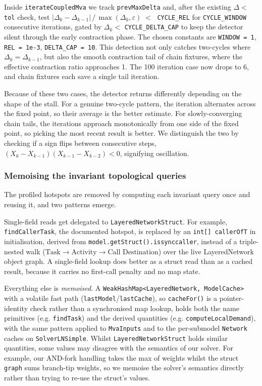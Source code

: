 Inside \texttt{iterateCoupledMva} we track \texttt{prevMaxDelta} and, after the existing \texttt{$\Delta <$ tol} check, test $|\Delta_k - \Delta_{k-1}| \,/\, \max(\Delta_k, \varepsilon) \;<\;$ \texttt{CYCLE\_REL} for \texttt{CYCLE\_WINDOW} consecutive iterations, gated by $\Delta_k <$ \texttt{CYCLE\_DELTA\_CAP} to keep the detector silent through the early contraction phase. The chosen constants are \texttt{WINDOW = 1}, \texttt{REL = 1e-3}, \texttt{DELTA\_CAP = 10}. This detection not only catches two-cycles where $\Delta_k = \Delta_{k-1}$, but also the smooth contraction tail of chain fixtures, where the effective contraction ratio approaches 1. The 100 iteration case now drops to 6, and chain fixtures each save a single tail iteration.

Because of these two cases, the detector returns differently depending on the shape of the stall. For a genuine two-cycle pattern, the iteration alternates across the fixed point, so their average is the better estimate. For slowly-converging chain tails, the iterations approach monotonically from one side of the fixed point, so picking the most recent result is better. We distinguish the two by checking if a sign flips between consecutive steps, $(X_k - X_{k-1})(X_{k-1} - X_{k-2}) < 0$, signifying oscillation.

\subsubsection*{Memoising the invariant topological queries}

The profiled hotspots are removed by computing each invariant query once and reusing it, and two patterns emerge. 

Single-field reads get delegated to \texttt{LayeredNetworkStruct}. For example, \texttt{findCallerTask}, the documented hotspot, is replaced by an \texttt{int[] callerOfT} in initialisation, derived from \texttt{model.getStruct().issynccaller}, instead of a triple-nested walk ($\text{Task} \rightarrow \text{Activity} \rightarrow \text{Call Destination}$) over the live LayeredNetwork object graph. A single-field lookup does better as a struct read than as a cached result, because it carries no first-call penalty and no map state.

Everything else is \emph{memoised}. A \texttt{WeakHashMap<LayeredNetwork, ModelCache>} with a volatile fast path (\texttt{lastModel}/\texttt{lastCache}), so \texttt{cacheFor()} is a pointer-identity check rather than a synchronised map lookup, holds both the name primitives (e.g. \texttt{findTask}) and the derived quantities (e.g. \texttt{computeLocalDemand}), with the same pattern applied to \texttt{MvaInputs} and to the per-submodel \texttt{Network} caches on \texttt{SolverLNSimple}. Whilst \texttt{LayeredNetworkStruct} holds similar quantities, some values may disagree with the semantics of our solver. For example, our AND-fork handling takes the max of weights whilst the struct \texttt{graph} sums branch-tip weights, so we memoise the solver's semantics directly rather than trying to re-use the struct's values.

